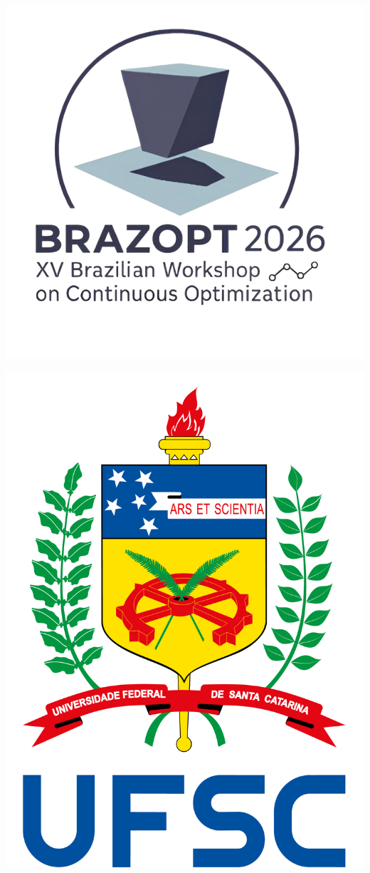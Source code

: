 \documentclass[a0,portrait]{a0poster}
\begin{document}
\parbox{0.3\textwidth}{
\begin{center}
\hspace{10cm}
\includegraphics[scale=0.8]{BrazOpt_LOGO.png}
\end{center}}
\parbox{0.4\textwidth}{\begin{center}
\includegraphics[scale=0.20]{brasao_UFSC.png}
\end{center}
}
\end{document}
